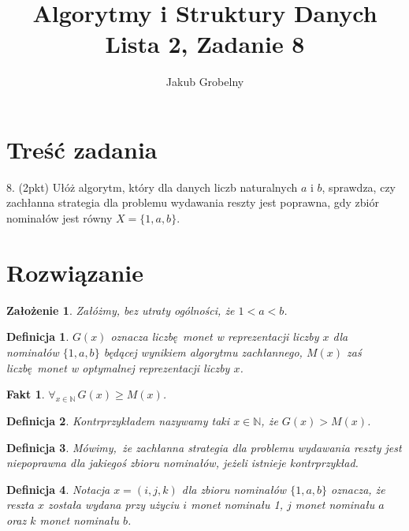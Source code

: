 \documentclass[12pt]{article}
\title{\bfseries Algorytmy i Struktury Danych\\\Large Lista 2, Zadanie 8}
\date{}
\author{\large Jakub Grobelny}
\newtheorem{definition}{Definicja}
\newtheorem*{assumption*}{Założenie}
\newtheorem{fact}{Fakt}
\begin{document}
\begin{titlepage}
\maketitle
\thispagestyle{empty}

\section{Treść zadania}

8. (2pkt) Ułóż algorytm, który dla danych liczb naturalnych $a$ i $b$, sprawdza,
czy zachłanna strategia dla problemu wydawania reszty jest poprawna, gdy zbiór
nominałów jest równy $X = \{1, a, b\}$.

\section{Rozwiązanie}

\begin{assumption*}
\normalfont
Załóżmy, bez utraty ogólności, że $1 < a < b$.
\end{assumption*}

\begin{definition}
\normalfont
$G(x)$ oznacza liczbę monet w reprezentacji liczby $x$ dla nominałów $\{1, a, b\}$ 
będącej wynikiem algorytmu zachłannego, $M(x)$ zaś liczbę monet w optymalnej
reprezentacji liczby $x$.
\end{definition}

\begin{fact}\normalfont
$\forall_{x\in\mathds{N}}\, G(x) \geq M(x)$.
\end{fact}

\begin{definition}
\normalfont
Kontrprzykładem nazywamy taki $x \in \mathds{N}$, że $G(x) > M(x)$.
\end{definition}
    
\begin{definition}
\normalfont
Mówimy, że zachłanna strategia dla problemu wydawania reszty jest niepoprawna dla
jakiegoś zbioru nominałów, jeżeli istnieje kontrprzykład.
\end{definition}


\begin{definition}
\normalfont
Notacja $x = (i, j, k)$ dla zbioru nominałów $\{1, a, b\}$ oznacza, że reszta $x$ została wydana przy użyciu $i$
monet nominału 1, $j$ monet nominału $a$ oraz $k$ monet nominału $b$.
\end{definition}


\end{titlepage}
\end{document}
